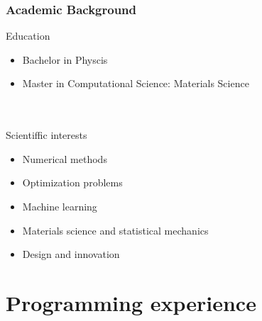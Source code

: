 \documentclass[
	10pt, %
]{beamer}
\begin{document}
\begin{frame}
	\frametitle{Academic Background}

	{\large Education}
	\begin{itemize}
		\item Bachelor in Physcis
		\item Master in Computational Science: Materials Science 
	\end{itemize}
	\hfill \\
	\hfill \\
	{\large Scientiffic interests}
	\begin{itemize}
		\item Numerical methods
		\item Optimization problems
		\item Machine learning
		\item Materials science and statistical mechanics
		\item Design and innovation
	\end{itemize}
\end{frame}


\section{Programming experience}
\end{document}
